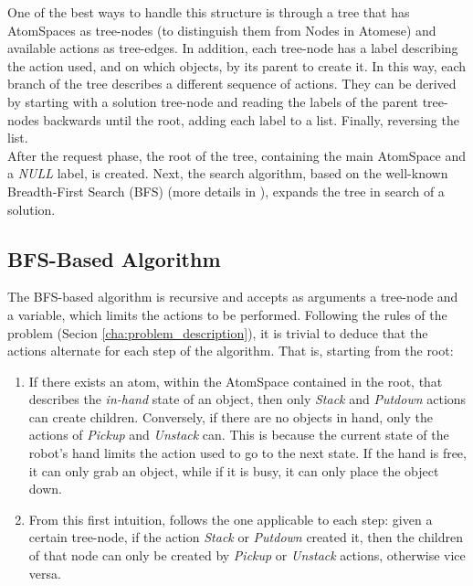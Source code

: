 One of the best ways to handle this structure is through a tree that has AtomSpaces as tree-nodes (to distinguish them from Nodes in Atomese) and available actions as tree-edges.
In addition, each tree-node has a label describing the action used, and on which objects, by its parent to create it.
In this way, each branch of the tree describes a different sequence of actions. They can be derived by starting with a solution tree-node and reading the labels of the parent tree-nodes backwards until the root, adding each label to a list. Finally, reversing the list.  \\

After the request phase, the root of the tree, containing the main AtomSpace and a \textit{NULL} label, is created. 
Next, the search algorithm, based on the well-known Breadth-First Search (BFS) (more details in \cite{BFS-wiki, BFS}), expands the tree in search of a solution.

\subsection{BFS-Based Algorithm}\label{sec:bfs_search}

The BFS-based algorithm is recursive and accepts as arguments a tree-node and a variable, which limits the actions to be performed. 
Following the rules of the problem (Secion \ref{cha:problem_description}), it is trivial to deduce that the actions alternate for each step of the algorithm.
That is, starting from the root:

\begin{enumerate} 
	\item If there exists an atom, within the AtomSpace contained in the root, that describes the \textit{in-hand} state of an object, then only \textit{Stack} and \textit{Putdown} actions can create children. Conversely, if there are no objects in hand, only the actions of \textit{Pickup} and \textit{Unstack} can. This is because the current state of the robot's hand limits the action used to go to the next state. If the hand is free, it can only grab an object, while if it is busy, it can only place the object down.

	\item From this first intuition, follows the one applicable to each step: given a certain tree-node, if the action \textit{Stack} or \textit{Putdown} created it, then the children of that node can only be created by \textit{Pickup} or \textit{Unstack} actions, otherwise vice versa.
\end{enumerate}

